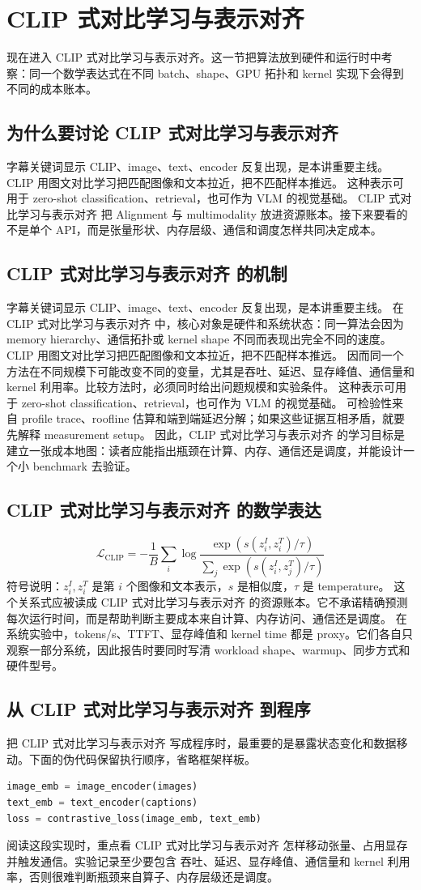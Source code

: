 \documentclass[a4paper]{article}
\begin{document}
\section{CLIP 式对比学习与表示对齐}
现在进入 CLIP 式对比学习与表示对齐。这一节把算法放到硬件和运行时中考察：同一个数学表达式在不同 batch、shape、GPU 拓扑和 kernel 实现下会得到不同的成本账本。
\subsection{为什么要讨论 CLIP 式对比学习与表示对齐}
字幕关键词显示 CLIP、image、text、encoder 反复出现，是本讲重要主线。
CLIP 用图文对比学习把匹配图像和文本拉近，把不匹配样本推远。
这种表示可用于 zero-shot classification、retrieval，也可作为 VLM 的视觉基础。
CLIP 式对比学习与表示对齐 把 Alignment 与 multimodality 放进资源账本。接下来要看的不是单个 API，而是张量形状、内存层级、通信和调度怎样共同决定成本。
\subsection{CLIP 式对比学习与表示对齐 的机制}
字幕关键词显示 CLIP、image、text、encoder 反复出现，是本讲重要主线。 在 CLIP 式对比学习与表示对齐 中，核心对象是硬件和系统状态：同一算法会因为 memory hierarchy、通信拓扑或 kernel shape 不同而表现出完全不同的速度。
CLIP 用图文对比学习把匹配图像和文本拉近，把不匹配样本推远。 因而同一个方法在不同规模下可能改变不同的变量，尤其是吞吐、延迟、显存峰值、通信量和 kernel 利用率。比较方法时，必须同时给出问题规模和实验条件。
这种表示可用于 zero-shot classification、retrieval，也可作为 VLM 的视觉基础。 可检验性来自 profile trace、roofline 估算和端到端延迟分解；如果这些证据互相矛盾，就要先解释 measurement setup。
因此，CLIP 式对比学习与表示对齐 的学习目标是建立一张成本地图：读者应能指出瓶颈在计算、内存、通信还是调度，并能设计一个小 benchmark 去验证。
\subsection{CLIP 式对比学习与表示对齐 的数学表达}
\[\mathcal{L}_{\text{CLIP}}=-\frac{1}{B}\sum_i \log\frac{\exp(s(z^I_i,z^T_i)/\tau)}{\sum_j\exp(s(z^I_i,z^T_j)/\tau)}\]
符号说明：\(z^I_i,z^T_i\) 是第 \(i\) 个图像和文本表示，\(s\) 是相似度，\(\tau\) 是 temperature。
这个关系式应被读成 CLIP 式对比学习与表示对齐 的资源账本。它不承诺精确预测每次运行时间，而是帮助判断主要成本来自计算、内存访问、通信还是调度。
在系统实验中，tokens/s、TTFT、显存峰值和 kernel time 都是 proxy。它们各自只观察一部分系统，因此报告时要同时写清 workload shape、warmup、同步方式和硬件型号。
\subsection{从 CLIP 式对比学习与表示对齐 到程序}
把 CLIP 式对比学习与表示对齐 写成程序时，最重要的是暴露状态变化和数据移动。下面的伪代码保留执行顺序，省略框架样板。
\begin{lstlisting}[language=Python]
image_emb = image_encoder(images)
text_emb = text_encoder(captions)
loss = contrastive_loss(image_emb, text_emb)
\end{lstlisting}
阅读这段实现时，重点看 CLIP 式对比学习与表示对齐 怎样移动张量、占用显存并触发通信。实验记录至少要包含 吞吐、延迟、显存峰值、通信量和 kernel 利用率，否则很难判断瓶颈来自算子、内存层级还是调度。
\end{document}
